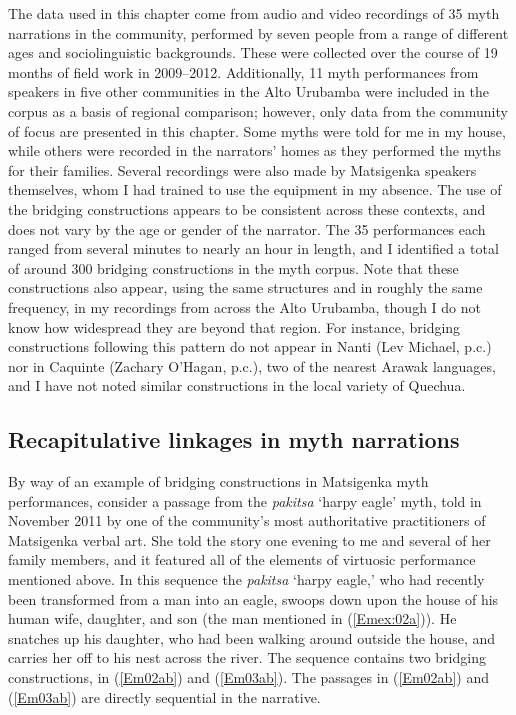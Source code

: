 \documentclass[output=paper]{LSP/langsci}
\begin{document}
The data used in this chapter come from audio and video recordings of 35 myth narrations in the community, performed by seven people from a range of different ages and sociolinguistic backgrounds. These were collected over the course of 19 months of field work in 2009--2012. Additionally, 11 myth performances from speakers in five other communities in the Alto Urubamba were included in the corpus as a basis of regional comparison; however, only data from the community of focus are presented in this chapter. Some myths were told for me in my house, while others were recorded in the narrators’ homes as they performed the myths for their families. Several recordings were also made by Matsigenka speakers themselves, whom I had trained to use the equipment in my absence. The use of the bridging constructions appears to be consistent across these contexts, and does not vary by the age or gender of the narrator. The 35 performances each ranged from several minutes to nearly an hour in length, and I identified a total of around 300 bridging constructions in the myth corpus. Note that these constructions also appear, using the same structures and in roughly the same frequency, in my recordings from across the Alto Urubamba, though I do not know how widespread they are beyond that region. For instance, bridging constructions following this pattern do not appear in Nanti (Lev Michael, p.c.) nor in Caquinte (Zachary O’Hagan, p.c.), two of the nearest Arawak languages, and I have not noted similar constructions in the local variety of Quechua. 

\subsection{Recapitulative linkages in myth narrations}
\label{Emrecap.myth}
By way of an example of bridging constructions in Matsigenka myth performances, consider a passage from the \textit{pakitsa} `harpy eagle' myth, told in November 2011 by one of the community’s most authoritative practitioners of Matsigenka verbal art. She told the story one evening to me and several of her family members, and it featured all of the elements of virtuosic performance mentioned above. In this sequence the \textit{pakitsa} `harpy eagle,' who had recently been transformed from a man into an eagle, swoops down upon the house of his human wife, daughter, and son (the man mentioned in (\ref{Emex:02a})). He snatches up his daughter, who had been walking around outside the house, and carries her off to his nest across the river. The sequence contains two bridging constructions, in (\ref{Em02ab}) and (\ref{Em03ab}). The passages in (\ref{Em02ab}) and (\ref{Em03ab}) are directly sequential in the narrative. 
\end{document}
